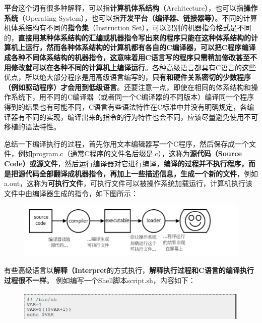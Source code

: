 \documentclass[12pt]{book}
\begin{document}
\textbf{平台}这个词有很多种解释，可以指\textbf{计算机体系结构}（Architecture），也可以指\textbf{操作系统}（Operating
System），也可以指\textbf{开发平台（编译器、链接器等）}。不同的计算机体系结构有不同的\textbf{指令集}（Instruction
Set），可以识别的机器指令格式是不同的，\textbf{直接用某种体系结构的汇编或机器指令写出来的程序只能在这种体系结构的计算机上运行，然而各种体系结构的计算机都有各自的C编译器，可以把C程序编译成各种不同体系结构的机器指令，这意味着用C语言写的程序只需稍加修改甚至不用修改就可以在各种不同的计算机上编译运行}。各种高级语言都具有C语言的这些优点，所以绝大部分程序是用高级语言编写的，\textbf{只有和硬件关系密切的少数程序（例如驱动程序）才会用到低级语言}。还要注意一点，即使在相同的体系结构和操作系统下，用不同的C编译器（或者同一个C编译器的不同版本）编译同一个程序得到的结果也有可能不同，C语言有些语法特性在C标准中并没有明确规定，各编译器有不同的实现，编译出来的指令的行为特性也会不同，应该尽量避免使用不可移植的语法特性。

总结一下编译执行的过程，首先你用文本编辑器写一个C程序，然后保存成一个文件，例如program.c（通常C程序的文件名后缀是.c），这称为\textbf{源代码（Source
Code）或源文件}，然后运行编译器对它进行编译，\textbf{编译的过程并不执行程序，而是把源代码全部翻译成机器指令，再加上一些描述信息，生成一个新的文件}，例如a.out，这称为\textbf{可执行文件}，可执行文件可以被操作系统加载运行，计算机执行该文件中由编译器生成的指令，如下图所示：

\begin{figure}[H]
\centering
\includegraphics[scale=0.5]{image//C语言入门//程序的基本概念//2.png}
\end{figure}

有些高级语言以\textbf{解释（Interpret}的方式执行，\textbf{解释执行过程和C语言的编译执行过程很不一样}。
例如编写一个Shell脚本script.sh，内容如下：

\begin{figure}[H]
\centering
\includegraphics[scale=0.5]{image//C语言入门//程序的基本概念//3.png}
\end{figure}
\end{document}
